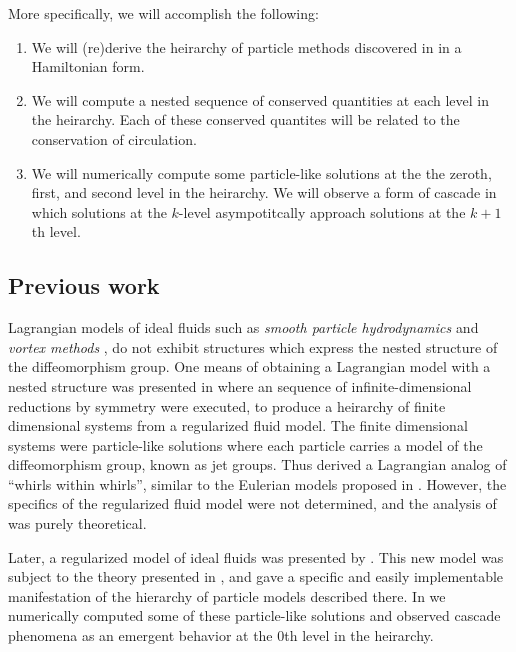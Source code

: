 \documentclass[12pt]{amsart}
\begin{document}
More specifically, we will accomplish the following:
\begin{enumerate}
  \item We will (re)derive the heirarchy of particle methods discovered in \cite{JacobsRatiuDesbrun2013,MumfordMichor2013,CotterHolmJacobsMeier2014} in a Hamiltonian form.
  \item We will compute a nested sequence of conserved quantities at 
    each level in the heirarchy.
    Each of these conserved quantites will be related to the conservation
    of circulation.
  \item We will numerically compute some particle-like solutions at the the zeroth, first, and second level in the heirarchy.  We will observe a form of cascade in which solutions at the $k$-level asympotitcally approach
    solutions at the $k+1$th level.
\end{enumerate}


\subsection{Previous work}
  Lagrangian models of ideal fluids such as \emph{smooth particle hydrodynamics} \cite{Monaghan1977,Lucy1977} and
\emph{vortex methods} \cite{Chorin1973}, do not exhibit structures which express the nested structure of the diffeomorphism group.
 One means of obtaining a Lagrangian model with a nested structure
 was presented in \cite{JacobsRatiuDesbrun2013}
 where an sequence of infinite-dimensional reductions by symmetry were
 executed, to produce a heirarchy of finite dimensional systems from a
 regularized fluid model.
 The finite dimensional systems were particle-like solutions
 where each particle carries a model of the diffeomorphism group,
 known as jet groups.
 Thus \cite{JacobsRatiuDesbrun2013} derived a Lagrangian analog of 
 ``whirls within whirls'', similar to the Eulerian models proposed
 in \cite{HolmTronci2012}.
 However, the specifics of the regularized fluid model were not determined,
 and the analysis of \cite{JacobsRatiuDesbrun2013} was purely
 theoretical.
 
 Later, a regularized model of ideal fluids was presented by
 \cite{MumfordMichor2013}.
 This new model was subject to the theory presented in 
 \cite{JacobsRatiuDesbrun2013}, and gave a specific and easily
 implementable manifestation of the hierarchy of particle models
 described there.
 In \cite{CotterHolmJacobsMeier2014} we numerically computed some
 of these particle-like solutions and observed cascade phenomena as
 an emergent behavior at the $0$th level in the heirarchy.
\end{document}
